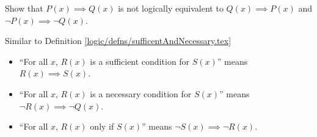 \begin{exercise}
  Show that $P(x)\implies Q(x)$ is not logically equivalent to $Q(x)\implies P(x)$ and $\neg P(x)\implies \neg Q(x)$.
\end{exercise}

Similar to Definition \ref{logic/defns/sufficentAndNecessary.tex}
\begin{itemize}
  \item ``For all $x$, $R(x)$ is a sufficient condition for $S(x)$'' means $R(x)\implies S(x)$.
  \item ``For all $x$, $R(x)$ is a necessary condition for $S(x)$'' means $\neg R(x)\implies \neg Q(x)$.
  \item ``For all $x$, $R(x)$ only if $S(x)$'' means $\neg S(x)\implies \neg R(x)$.
\end{itemize}

